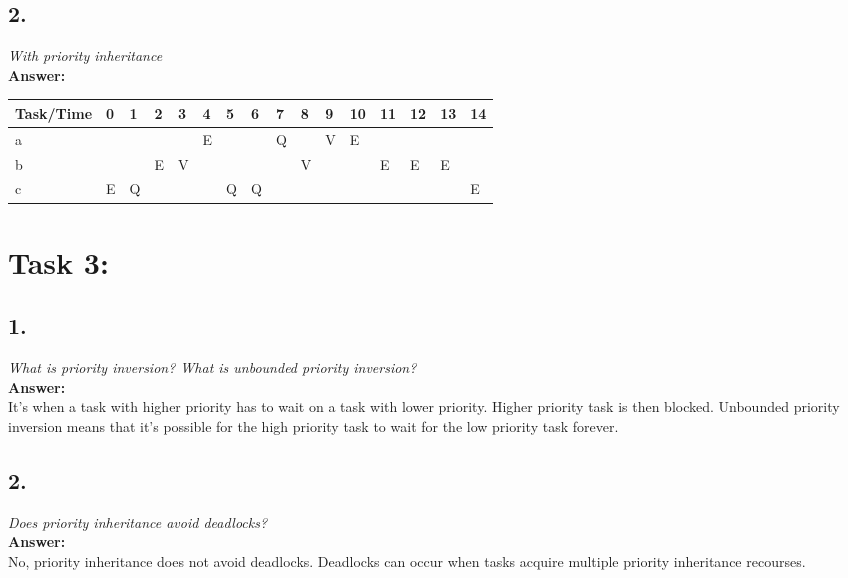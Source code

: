 \documentclass{article}
\begin{document}
\subsection*{2.}   
    \textit{With priority inheritance} \\
    \textbf{Answer:}\\
    
    \begin{table}[h!]
    \centering
    \begin{tabular}{|l|l|l|l|l|l|l|l|l|l|l|l|l|l|l|l|}
    \hline
    Task/Time & 0 & 1 & 2 & 3 & 4 & 5 & 6 & 7 & 8 & 9 & 10 & 11 & 12 & 13 & 14 \\ \hline
    a         &   &   &   &   & E &   &   & Q &   & V & E  &    &    &    &    \\ \hline
    b         &   &   & E & V &   &   &   &   & V &   &    & E  & E  & E  &    \\ \hline
    c         & E & Q &   &   &   & Q & Q &   &   &   &    &    &    &    & E  \\ \hline
    \end{tabular}
    \end{table}
    
    
\section*{Task 3:}

\subsection*{1.}
\textit{What is priority inversion? What is unbounded priority inversion?}\\
    \textbf{Answer:}\\
It's when a task with higher priority has to wait on a task with lower priority. Higher priority task is then blocked. Unbounded priority inversion means that it's possible for the high priority task to wait for the low priority task forever.

\subsection*{2.}
\textit{Does priority inheritance avoid deadlocks?} \\
    \textbf{Answer:}\\
    No, priority inheritance does not avoid deadlocks. Deadlocks can occur when tasks acquire multiple priority inheritance recourses.
    
\end{document}
